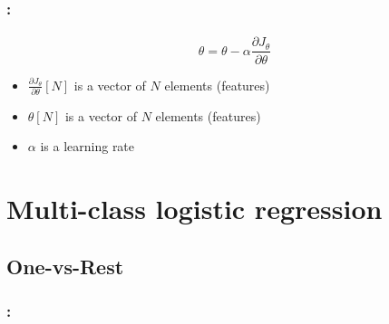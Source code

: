 \documentclass[xcolor=table]{beamer}
\begin{document}
\begin{frame}
	\frametitle{\insertshortsubtitle: \insertsection}
	\framesubtitle{\insertsubsection}

	\[\theta = \theta - \alpha \frac{\partial J_\theta}{\partial \theta}\]
	
	\begin{itemize}
		\item $\frac{\partial J_\theta}{\partial \theta}[N]$ is a vector of $N$ elements (features)
		\item $\theta[N]$ is a vector of $N$ elements (features)
		\item $\alpha $ is a learning rate
	\end{itemize}
	
\end{frame}

\section{Multi-class logistic regression}

\begin{frame}
	\frametitle{\insertshortsubtitle}
	\framesubtitle{\insertsection}
	

	\begin{center}
		 \hskip0.25cm
		 \vskip0.25cm
	\end{center}
	
\end{frame}

\subsection{One-vs-Rest}

\begin{frame}
	\frametitle{\insertshortsubtitle: \insertsection}
	\framesubtitle{\insertsubsection}
	
	\begin{center}
	\end{center}
	
\end{frame}
\end{document}
